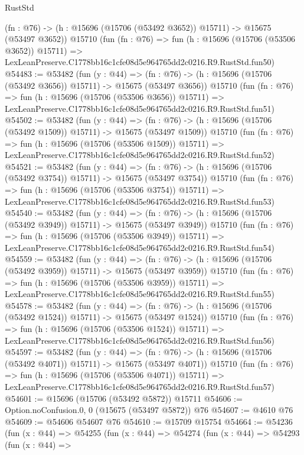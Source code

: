 \begin{lexlean}{RustStd}
\begin{coremodule}
    (fn : @76) -> (h : @15696 (@15706 (@53492 @3652)) @15711) -> @15675 (@53497 @3652))
    @15710
    (fun (fn : @76) =>
    fun (h : @15696 (@15706 (@53506 @3652)) @15711) =>
    LexLeanPreserve.C1778bb16c1cfe08d5e964765dd2c0216.R9.RustStd.fun50)
@54483 := @53482
    (fun (y : @44) =>
    (fn : @76) -> (h : @15696 (@15706 (@53492 @3656)) @15711) -> @15675 (@53497 @3656))
    @15710
    (fun (fn : @76) =>
    fun (h : @15696 (@15706 (@53506 @3656)) @15711) =>
    LexLeanPreserve.C1778bb16c1cfe08d5e964765dd2c0216.R9.RustStd.fun51)
@54502 := @53482
    (fun (y : @44) =>
    (fn : @76) -> (h : @15696 (@15706 (@53492 @1509)) @15711) -> @15675 (@53497 @1509))
    @15710
    (fun (fn : @76) =>
    fun (h : @15696 (@15706 (@53506 @1509)) @15711) =>
    LexLeanPreserve.C1778bb16c1cfe08d5e964765dd2c0216.R9.RustStd.fun52)
@54521 := @53482
    (fun (y : @44) =>
    (fn : @76) -> (h : @15696 (@15706 (@53492 @3754)) @15711) -> @15675 (@53497 @3754))
    @15710
    (fun (fn : @76) =>
    fun (h : @15696 (@15706 (@53506 @3754)) @15711) =>
    LexLeanPreserve.C1778bb16c1cfe08d5e964765dd2c0216.R9.RustStd.fun53)
@54540 := @53482
    (fun (y : @44) =>
    (fn : @76) -> (h : @15696 (@15706 (@53492 @3949)) @15711) -> @15675 (@53497 @3949))
    @15710
    (fun (fn : @76) =>
    fun (h : @15696 (@15706 (@53506 @3949)) @15711) =>
    LexLeanPreserve.C1778bb16c1cfe08d5e964765dd2c0216.R9.RustStd.fun54)
@54559 := @53482
    (fun (y : @44) =>
    (fn : @76) -> (h : @15696 (@15706 (@53492 @3959)) @15711) -> @15675 (@53497 @3959))
    @15710
    (fun (fn : @76) =>
    fun (h : @15696 (@15706 (@53506 @3959)) @15711) =>
    LexLeanPreserve.C1778bb16c1cfe08d5e964765dd2c0216.R9.RustStd.fun55)
@54578 := @53482
    (fun (y : @44) =>
    (fn : @76) -> (h : @15696 (@15706 (@53492 @1524)) @15711) -> @15675 (@53497 @1524))
    @15710
    (fun (fn : @76) =>
    fun (h : @15696 (@15706 (@53506 @1524)) @15711) =>
    LexLeanPreserve.C1778bb16c1cfe08d5e964765dd2c0216.R9.RustStd.fun56)
@54597 := @53482
    (fun (y : @44) =>
    (fn : @76) -> (h : @15696 (@15706 (@53492 @4071)) @15711) -> @15675 (@53497 @4071))
    @15710
    (fun (fn : @76) =>
    fun (h : @15696 (@15706 (@53506 @4071)) @15711) =>
    LexLeanPreserve.C1778bb16c1cfe08d5e964765dd2c0216.R9.RustStd.fun57)
@54601 := @15696 (@15706 (@53492 @5872)) @15711
@54606 := Option.noConfusion.{0, 0} (@15675 (@53497 @5872)) @76
@54607 := @4610 @76
@54609 := @54606 @54607 @76
@54610 := @15709 @15754
@54664 := @54236
    (fun (x : @44) =>
    @54255
      (fun (x : @44) =>
      @54274
        (fun (x : @44) =>
        @54293
          (fun (x : @44) =>

\end{coremodule}
\end{lexlean}
